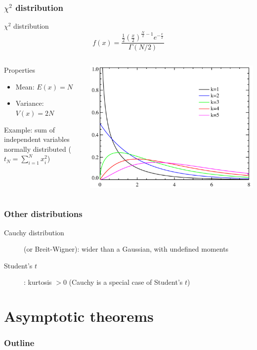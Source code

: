\documentclass[9pt]{beamer}
\begin{document}
\begin{frame}
 \frametitle{$\chi^2$ distribution}
 
 \begin{block}{$\chi^2$ distribution}
  $$f(x) = \frac{\frac{1}{2} \left( \frac{x}{2} \right)^{\frac{N}{2}-1} e^{-\frac{x}{2}}}{\Gamma(N/2)}$$
 \end{block}
  
 \begin{columns}
  \begin{column}{0.6\textwidth}
   
 \begin{block}{Properties}
  \begin{itemize}
   \item Mean: $E(x) = N$
   \item Variance: $V(x) = 2N$
  \end{itemize}
 \end{block}
 
 Example: sum of independent variables normally distributed ($t_N = \sum_{i=1}^{N} x_i^2$)
  \end{column}
  \begin{column}{0.4\textwidth}
   \includegraphics[width=\textwidth]{../figures/Chi-square_distributionPDF.png}
  \end{column}

 \end{columns}


\end{frame}


\begin{frame}
 \frametitle{Other distributions}
 
 \begin{description}
  \item[Cauchy distribution] (or Breit-Wigner): wider than a Gaussian, with undefined moments
  \item[Student's $t$]: kurtosis $>0$ (Cauchy is a special case of Student's $t$)
 \end{description}

\end{frame}

\section{Asymptotic theorems}

\begin{frame}
 \frametitle{Outline}
 
 \tableofcontents[current]
\end{frame}
\end{document}
